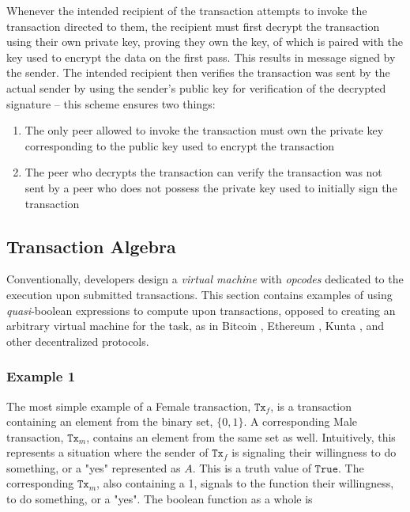\documentclass[10pt, titlepage, twocolumn]{report}
\begin{document}
\hspace*{15pt}
Whenever the intended recipient of the transaction attempts to invoke the transaction directed to them, the recipient must first decrypt the transaction using their own private key, proving they own the key, of which is paired with the key used to encrypt the data on the first pass. This results in message signed by the sender. The intended recipient then verifies the transaction was sent by the actual sender by using the sender's public key for verification of the decrypted signature  -- this scheme ensures two things:

\begin{enumerate}
	\item The only peer allowed to invoke the transaction must own the private key corresponding to the public key used to encrypt the transaction 
	\item The peer who decrypts the transaction can verify the transaction was not sent by a peer who does not possess the private key used to initially sign the transaction
\end{enumerate}



\subsection{Transaction Algebra}
\hspace*{15pt}
Conventionally, developers design a \textit{virtual machine} with \textit{opcodes} dedicated to the execution upon submitted transactions. This section contains examples of using \textit{quasi}-boolean expressions to compute upon transactions, opposed to creating an arbitrary virtual machine for the task, as in Bitcoin \cite{BTC}, Ethereum \cite{ETH}, Kunta \cite{KP}, and other decentralized protocols. 

\subsubsection{Example 1}
\hspace*{15pt}
The most simple example of a Female transaction, \(\texttt{Tx}_f\), is a transaction containing an element from the binary set, \(\{0,1\}\). A corresponding Male transaction, \(\texttt{Tx}_m\), contains an element from the same set as well. Intuitively, this represents a situation where the sender of \(\texttt{Tx}_f\) is signaling their willingness to do something, or a "yes" represented as \(A\). This is a truth value of \(\texttt{True}\). The corresponding \(\texttt{Tx}_m\), also containing a 1, signals to the function their willingness, to do something, or a "yes".  The boolean function as a whole is
\end{document}
